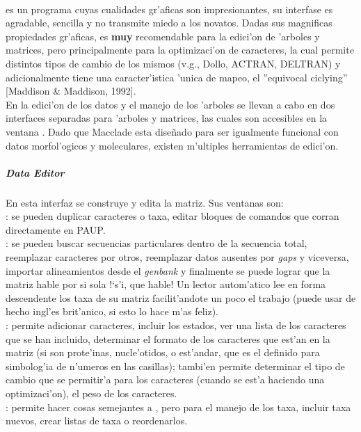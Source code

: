 \paragraph*{}
 es un programa cuyas cualidades gr'aficas son impresionantes, su interfase es agradable, sencilla y no transmite miedo a los novatos. Dadas sus magnificas propiedades gr'aficas, es \textbf{muy} recomendable para la edici'on de 'arboles y matrices, pero principalmente para la optimizaci'on de caracteres, la cual permite distintos tipos de cambio de los mismos (v.g., Dollo, ACTRAN, DELTRAN) y adicionalmente tiene una caracter'istica 'unica de mapeo, el ''equivocal ciclying'' [Maddison \& Maddison, 1992].\\
En  la edici'on de los datos y el manejo de los 'arboles se llevan a cabo en dos interfaces separadas para 'arboles y matrices, las cuales son accesibles en la ventana . Dado que Macclade esta dise\~nado para ser igualmente funcional con datos morfol'ogicos y moleculares,  existen m'ultiples herramientas de edici'on.\\
\subparagraph*{Data Editor}
En esta interfaz se construye y edita la matriz. Sus ventanas son:\\
: se pueden duplicar caracteres o taxa, editar bloques de comandos que corran directamente en PAUP. \\
: se pueden buscar secuencias particulares dentro de la secuencia total, reemplazar caracteres por otros, reemplazar
datos ausentes por \textit{gaps} y viceversa, importar alineamientos desde el \textit{genbank} y finalmente se puede lograr que la matriz hable por si sola !`s'i, que hable! Un lector autom'atico lee en forma descendente los taxa de su matriz facilit'andote un poco el trabajo (puede usar de hecho ingl'es brit'anico, si esto lo hace m'as feliz).\\
: permite adicionar caracteres, incluir los estados, ver una lista de los caracteres que se han incluido, determinar el formato de los caracteres que est'an en la matriz (si son prote'inas, nucle'otidos, o est'andar, que es el definido para simbolog'ia de n'umeros en las casillas); tambi'en permite determinar el tipo de cambio que se permitir'a para los caracteres (cuando se est'a haciendo una optimizaci'on), el peso de los caracteres.\\
: permite hacer cosas semejantes a , pero para el manejo de los taxa, incluir taxa nuevos, crear listas de taxa o reordenarlos. \\
